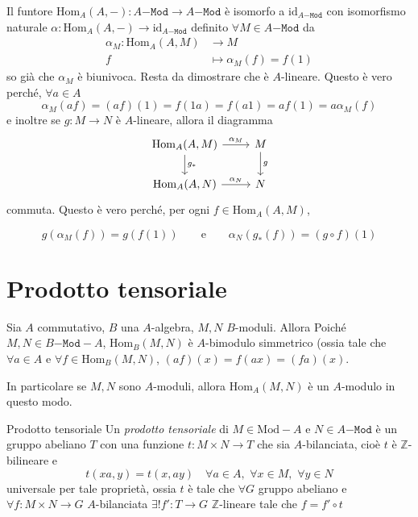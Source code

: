 \begin{example}{}
    Il funtore \(\mathrm{Hom}_A{(A, -)} : A\mathtt{-Mod} \to A\mathtt{-Mod}\) è
    isomorfo a \(\mathrm{id}_{A\mathtt{-Mod}} \) con isomorfismo naturale
    \(\alpha : \mathrm{Hom}_A{(A, -)} \to \mathrm{id}_{A\mathtt{-Mod}} \)
    definito \(\forall M \in A\mathtt{-Mod}\) da
    \begin{align*}
        \alpha_M: \mathrm{Hom}_A{(A, M)} &\longrightarrow M \\
        f &\longmapsto \alpha_M(f) = f{(1)}
    \end{align*}
    so già che \(\alpha_M\) è biunivoca. Resta da dimostrare che è
    \(A\)-lineare. Questo è vero perché, \(\forall a \in A\) 
    \[
      \alpha_M {(af)} = {(af)}{(1)} = f{(1a)} = f{(a1)} = af{(1)} = a\alpha_M {(f)}
    \]
    e inoltre se \(g : M \to N\) è \(A\)-lineare, allora il diagramma
    \[\begin{tikzcd}
	\mathrm{Hom}_A{(A, M)} & M \\
	\mathrm{Hom}_A{(A, N)} & N
	\arrow["{\alpha_M}", from=1-1, to=1-2]
	\arrow["{g_*}", from=1-1, to=2-1]
	\arrow["g", from=1-2, to=2-2]
	\arrow["{\alpha_N}", from=2-1, to=2-2]
\end{tikzcd} \]
        commuta. Questo è vero perché, per ogni \(f \in \mathrm{Hom}_A{(A, M)}\),
    
        \[
            g{(\alpha_M{(f)})} = g{(f{(1)})}
            \qquad\text{e}\qquad
            \alpha_N{(g_*{(f)})} = {(g \circ f)}{(1)}
        \]
\end{example}

\section{Prodotto tensoriale}

\begin{example}{}
    Sia \(A\) commutativo, \(B\) una \(A\)-algebra, \(M, N\) \(B\)-moduli.
    Allora Poiché \(M, N \in B\mathtt{-Mod-}A\), \(\mathrm{Hom}_B{(M, N)}\) è
    \(A\)-bimodulo simmetrico (ossia tale che \(\forall a \in A\) e \(\forall f
    \in \mathrm{Hom}_B{(M, N)}\), \({(af)}{(x)} = f{(ax)} = {(fa)}{(x)}\).

    In particolare se \(M, N\) sono \(A\)-moduli, allora \(\mathrm{Hom}_A{(M,
    N)}\) è un \(A\)-modulo in questo modo.
\end{example}


\begin{definition}{Prodotto tensoriale}
    Un \emph{prodotto tensoriale} di \(M \in \mathrm{Mod-}A\) e \(N \in
    A\mathtt{-Mod}\) è un gruppo abeliano \(T\) con una funzione \(t: M \times N
    \to T\) che sia \(A\)-bilanciata, cioè \(t\) è \(\mathbb{Z}\)-bilineare e
    \[
      t{(xa, y)} = t{(x, ay)} \quad \forall a \in A,\,\, \forall x \in M,\,\,
      \forall y \in N
    \]
    universale per tale proprietà, ossia \(t\) è
    tale che \(\forall G\) gruppo abeliano e \(\forall f: M \times N \to G\)
    \(A\)-bilanciata \(\exists ! f' : T \to G\) \(\mathbb{Z}\)-lineare tale che
    \(f = f' \circ t\) 
\end{definition}

